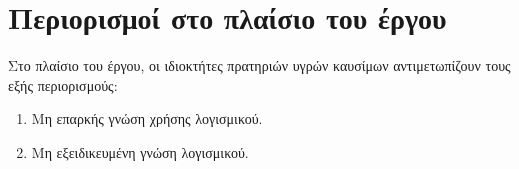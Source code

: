 \section{Περιορισμοί στο πλαίσιο του έργου}

Στο πλαίσιο του έργου, οι ιδιοκτήτες πρατηριών υγρών καυσίμων αντιμετωπίζουν τους εξής περιορισμούς:
\begin{enumerate}
	\item Μη επαρκής γνώση χρήσης λογισμικού.
	\item Μη εξειδικευμένη γνώση λογισμικού.	
\end{enumerate}
